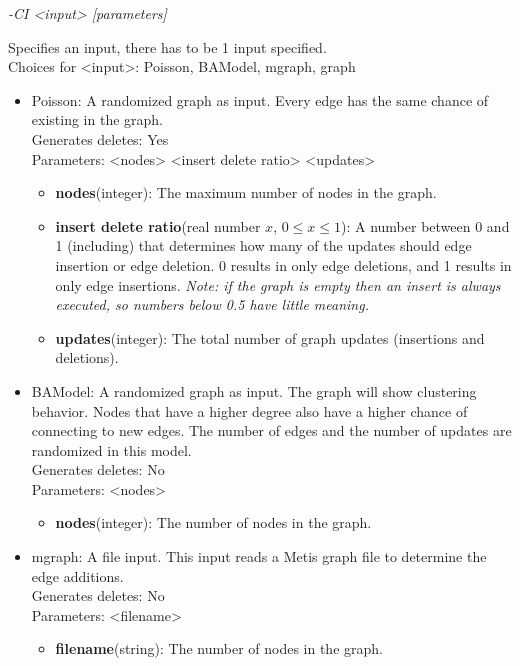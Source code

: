 \documentclass[a4paper]{article}
\begin{document}
\emph{-CI <input> [parameters]}

Specifies an input, there has to be 1 input specified.\\
Choices for <input>: Poisson, BAModel, mgraph, graph

\begin{itemize}
	\item Poisson: A randomized graph as input. Every edge has the same chance of existing in the graph. \\
	Generates deletes: Yes \\
	Parameters: <nodes> <insert delete ratio> <updates> 
	
	\begin{itemize}
		\item \textbf{nodes}(integer):  The maximum number of nodes in the graph.
		\item \textbf{insert delete ratio}(real number $x$, $0\leq x\leq 1$): A number between 0 and 1 (including) that determines how many of the updates should edge insertion or edge deletion. 0 results in only edge deletions, and 1 results in only edge insertions. \textit{Note: if the graph is empty then an insert is always executed, so numbers below 0.5 have little meaning.}
		\item \textbf{updates}(integer): The total number of graph updates (insertions and deletions). 
	\end{itemize}
	
	\item BAModel: A randomized graph as input. The graph will show clustering behavior. Nodes that have a higher degree also have a higher chance of connecting to new edges. The number of edges and the number of updates are randomized in this model. \\
	Generates deletes: No \\
	Parameters: <nodes>
	
	\begin{itemize}
		\item \textbf{nodes}(integer): The number of nodes in the graph.
	\end{itemize}
	
	\item mgraph: A file input. This input reads a Metis graph file to determine the edge additions. \\
	Generates deletes: No \\
	Parameters: <filename>
	
	\begin{itemize}
		\item \textbf{filename}(string): The number of nodes in the graph.
	\end{itemize}
	

\end{itemize}
\end{document}
